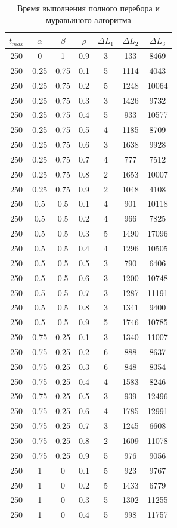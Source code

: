 \documentclass[a4paper,oneside,14pt]{extreport}
\begin{document}
\begin{table}[H]
\begin{center}
	\caption[]{\label{tbl:only} Время выполнения полного перебора и муравьиного алгоритма}
	\begin{tabular}{|c|c|c|c|c|c|c|}
		\hline
		$t_{max}$ & $\alpha$ & $\beta$ &$\rho$ & $\Delta L_{1}$ & $\Delta L_{2}$ & $\Delta L_{3}$\\
		\hline
		250 & 0 & 1 & 0.9 & 3 & 133 & 8469 \\
		250 & 0.25 & 0.75 & 0.1 & 5 & 1114 & 4043 \\
		250 & 0.25 & 0.75 & 0.2 & 5 & 1248 & 10064 \\
		250 & 0.25 & 0.75 & 0.3 & 3 & 1426 & 9732 \\
		250 & 0.25 & 0.75 & 0.4 & 5 & 933 & 10577 \\
		250 & 0.25 & 0.75 & 0.5 & 4 & 1185 & 8709 \\
		250 & 0.25 & 0.75 & 0.6 & 3 & 1638 & 9928 \\
		250 & 0.25 & 0.75 & 0.7 & 4 & 777 & 7512 \\
		250 & 0.25 & 0.75 & 0.8 & 2 & 1653 & 10007 \\
		250 & 0.25 & 0.75 & 0.9 & 2 & 1048 & 4108 \\
		250 & 0.5 & 0.5 & 0.1 & 4 & 901 & 10118 \\
		250 & 0.5 & 0.5 & 0.2 & 4 & 966 & 7825 \\
		250 & 0.5 & 0.5 & 0.3 & 5 & 1490 & 17096 \\
		250 & 0.5 & 0.5 & 0.4 & 4 & 1296 & 10505 \\
		250 & 0.5 & 0.5 & 0.5 & 3 & 790 & 6406 \\
		250 & 0.5 & 0.5 & 0.6 & 3 & 1200 & 10748 \\
		250 & 0.5 & 0.5 & 0.7 & 3 & 1287 & 11191 \\
		250 & 0.5 & 0.5 & 0.8 & 3 & 1341 & 9400 \\
		250 & 0.5 & 0.5 & 0.9 & 5 & 1746 & 10785 \\
		250 & 0.75 & 0.25 & 0.1 & 3 & 1340 & 11007 \\
		250 & 0.75 & 0.25 & 0.2 & 6 & 888 & 8637 \\
		250 & 0.75 & 0.25 & 0.3 & 6 & 848 & 8354 \\
		250 & 0.75 & 0.25 & 0.4 & 4 & 1583 & 8246 \\
		250 & 0.75 & 0.25 & 0.5 & 3 & 939 & 12496 \\
		250 & 0.75 & 0.25 & 0.6 & 4 & 1785 & 12991 \\
		250 & 0.75 & 0.25 & 0.7 & 3 & 1245 & 6608 \\
		250 & 0.75 & 0.25 & 0.8 & 2 & 1609 & 11078 \\
		250 & 0.75 & 0.25 & 0.9 & 5 & 976 & 9056 \\
		250 & 1 & 0 & 0.1 & 5 & 923 & 9767 \\
		250 & 1 & 0 & 0.2 & 5 & 1433 & 6779 \\
		250 & 1 & 0 & 0.3 & 5 & 1302 & 11255 \\
		250 & 1 & 0 & 0.4 & 5 & 998 & 11757 \\
		\hline
	\end{tabular}
\end{center}
\end{table}
\end{document}
